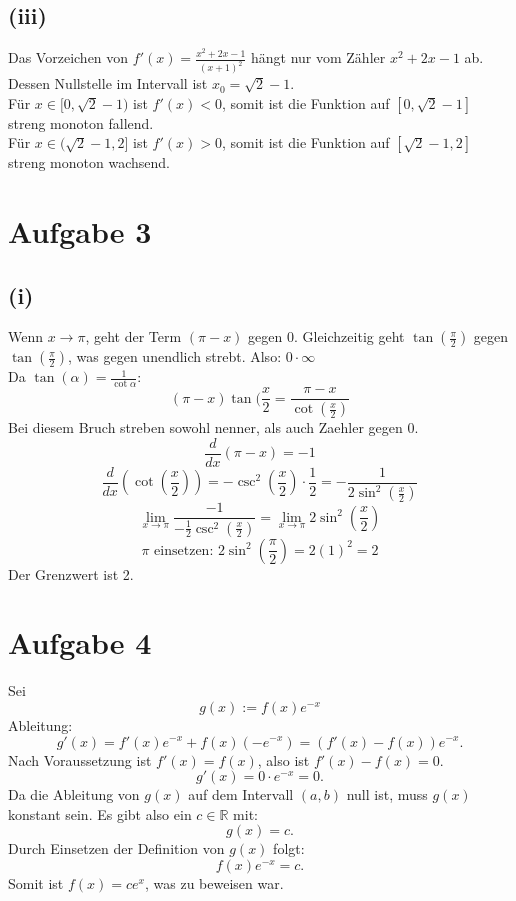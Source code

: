 \documentclass{article}
\begin{document}
\subsection*{(iii)}
Das Vorzeichen von \(f'(x) = \frac{x^2+2x-1}{(x+1)^2}\) hängt nur vom Zähler \(x^2+2x-1\) ab. \\
Dessen Nullstelle im Intervall ist \(x_0 = \sqrt{2}-1\). \\
\newline
Für \(x \in [0, \sqrt{2}-1)\) ist \(f'(x) < 0\), somit ist die Funktion auf \([0, \sqrt{2}-1]\) streng monoton fallend. \\
Für \(x \in (\sqrt{2}-1, 2]\) ist \(f'(x) > 0\), somit ist die Funktion auf \([\sqrt{2}-1, 2]\) streng monoton wachsend.

\section*{Aufgabe 3}
\subsection*{(i)}
Wenn $x \to \pi$, geht der Term $(\pi - x)$ gegen 0. Gleichzeitig geht $\tan(\frac{\pi}{2})$ gegen $\tan(\frac{\pi}{2})$, was gegen unendlich strebt. Also: $0 \cdot \infty$ \\
Da $\tan(\alpha) = \frac{1}{\cot{\alpha}}$:
\[(\pi - x)\tan(\frac{x}{2} = \frac{\pi - x}{\cot(\frac{x}{2})}\]
Bei diesem Bruch streben sowohl nenner, als auch Zaehler gegen 0.
\[\frac{d}{dx}(\pi - x) = -1\]
\[\frac{d}{dx}(\cot(\frac{x}{2})) = -\csc^2(\frac{x}{2}) \cdot \frac{1}{2} = -\frac{1}{2 \sin^2(\frac{x}{2})}\]
\[\lim_{x\to\pi} \frac{-1}{-\frac{1}{2} \csc^2(\frac{x}{2})} = \lim_{x\to\pi} 2 \sin^2(\frac{x}{2})\]
\[\pi\text{ einsetzen: } 2\sin^2(\frac{\pi}{2}) = 2(1)^2 = 2\]
Der Grenzwert ist 2.

\section*{Aufgabe 4}
Sei 
\[g(x) := f(x)e^{-x}\]
Ableitung:
\[g'(x) = f'(x)e^{-x} + f(x)(-e^{-x}) = (f'(x) - f(x))e^{-x}.\]
Nach Voraussetzung ist \(f'(x) = f(x)\), also ist \(f'(x) - f(x) = 0\).
\[g'(x) = 0 \cdot e^{-x} = 0.\]
Da die Ableitung von \(g(x)\) auf dem Intervall \((a,b)\) null ist, muss \(g(x)\) konstant sein. Es gibt also ein \(c \in \mathbb{R}\) mit:
\[g(x) = c.\]
Durch Einsetzen der Definition von \(g(x)\) folgt:
\[f(x)e^{-x} = c.\]
Somit ist \(f(x) = ce^x\), was zu beweisen war.
\end{document}
